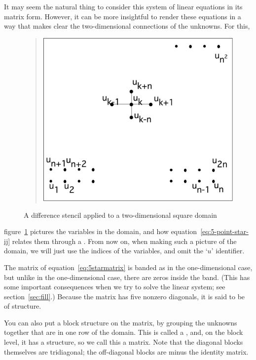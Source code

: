 It may seem the natural thing to consider
this system of linear equations in its matrix form.
However, it can be more insightful to render these equations in a way
that makes clear the two-dimensional connections of the unknowns. For this,
\begin{figure}
  \begin{quote}
    \includegraphics[scale=.11]{graphics/laplacedomain}
  \end{quote}
  \caption{A difference stencil applied to a two-dimensional square
    domain}
  \label{fig:laplacedomain}
\end{figure}
figure~\ref{fig:laplacedomain} pictures the variables in the domain,
and how 
equation~\eqref{eq:5-point-star-ij} relates them through a
%
.
From now on, when
making such a picture of the domain, we will
just use the indices of the variables, and omit the `$u$' identifier.

The matrix of equation~\ref{eq:5starmatrix} is banded as in the
one-dimensional case, but
unlike in the one-dimensional case, there are zeros inside the
band. (This has some important consequences when we try to solve the
linear system; see section~\ref{sec:fill}.) Because the matrix has five
nonzero diagonals, it is said to be of 
structure.

You can also put a block structure on the matrix, by grouping the
unknowns together that are in one row of the domain. This is called a
, and, on the block level, it
has a
 structure,
so we call this a
 matrix. Note that the diagonal blocks
themselves are tridiagonal; the off-diagonal blocks are
minus the identity matrix.

